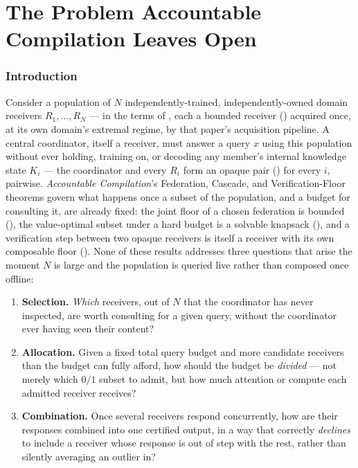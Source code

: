 \documentclass[11pt,twocolumn,a4paper]{article}
\theoremstyle{rdm}
\theoremstyle{definition}
\theoremstyle{remark}
\newcommand{\Know}{K}
\newcommand{\Rec}{R}
\begin{document}
\part{The Problem Accountable Compilation Leaves Open}
\label{part:problem}

\section{Introduction}
\label{sec:intro}

Consider a population of $N$ independently-trained, independently-owned
domain receivers $\Rec_1,\dots,\Rec_N$ — in the terms of
\citet{sachikonye-accountable-compilation}, each a bounded receiver
() acquired once, at its own domain's extremal
regime, by that paper's acquisition pipeline. A central coordinator, itself
a receiver, must answer a query $x$ using this population without ever
holding, training on, or decoding any member's internal knowledge state
$\Know_i$ — the coordinator and every $\Rec_i$ form an opaque pair
() for every $i$, pairwise. \emph{Accountable
Compilation}'s Federation, Cascade, and Verification-Floor theorems govern
what happens once a subset of the population, and a budget for consulting
it, are already fixed: the joint floor of a chosen federation is bounded
(), the value-optimal subset under a hard budget
is a solvable knapsack (), and a verification step
between two opaque receivers is itself a receiver with its own composable
floor (). None of these results addresses three
questions that arise the moment $N$ is large and the population is queried
live rather than composed once offline:

\begin{enumerate}[nosep]
\item \textbf{Selection.} \emph{Which} receivers, out of $N$ that the
coordinator has never inspected, are worth consulting for a given query,
without the coordinator ever having seen their content?
\item \textbf{Allocation.} Given a fixed total query budget and more
candidate receivers than the budget can fully afford, how should the budget
be \emph{divided} — not merely which $0/1$ subset to admit, but how much
attention or compute each admitted receiver receives?
\item \textbf{Combination.} Once several receivers respond concurrently,
how are their responses combined into one certified output, in a way that
correctly \emph{declines} to include a receiver whose response is out of
step with the rest, rather than silently averaging an outlier in?
\end{enumerate}
\end{document}
